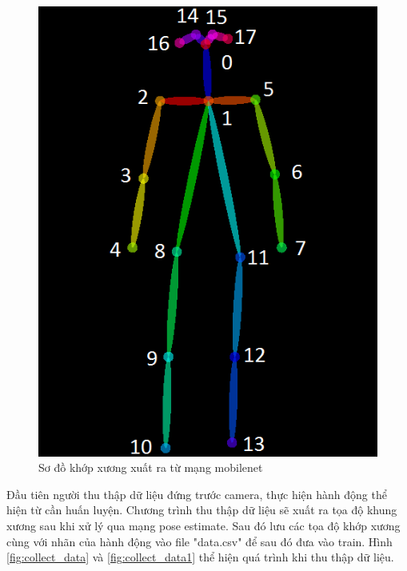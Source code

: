 \FloatBarrier
\begin{figure}[htp]
\begin{center}
\includegraphics[scale=0.6]{chap4/c4_figs/joints_order.png}
\end{center}
\caption{Sơ đồ khớp xương xuất ra từ mạng mobilenet}
\label{fig:joints}
\end{figure}
\FloatBarrier

Đầu tiên người thu thập dữ liệu đứng trước camera, thực hiện hành động thể hiện từ cần huấn luyện. Chương trình thu thập dữ liệu sẽ xuất ra tọa độ khung xương sau khi xử lý qua mạng pose estimate. Sau đó lưu các tọa độ khớp xương cùng với nhãn của hành động vào file "data.csv" để sau đó đưa vào train. Hình \ref{fig:collect_data} và \ref{fig:collect_data1} thể hiện quá trình khi thu thập dữ liệu.

